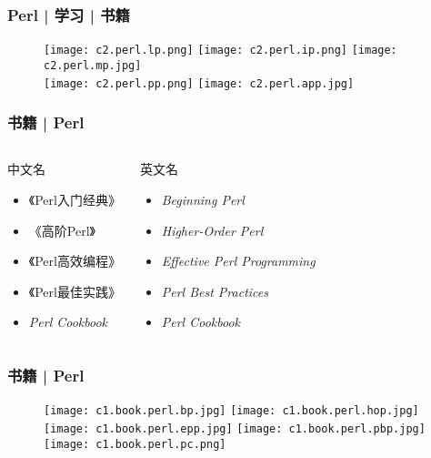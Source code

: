 \begin{frame}
  \frametitle{Perl | 学习 | 书籍}
  \begin{figure}
    \centering
    \texttt{[image: c2.perl.lp.png]}
    \qquad
    \texttt{[image: c2.perl.ip.png]}
    \qquad
    \texttt{[image: c2.perl.mp.jpg]}\\
    \texttt{[image: c2.perl.pp.png]}
    \hspace{2cm}
    \texttt{[image: c2.perl.app.jpg]}
  \end{figure}
\end{frame}

\begin{frame}
  \frametitle{书籍 | Perl}
  \begin{columns}
  \begin{block}{中文名}
    \begin{itemize}
      \item 《Perl入门经典》
      \item 《高阶Perl》
      \item 《Perl高效编程》
      \item 《Perl最佳实践》
      \item \textit{Perl Cookbook}
    \end{itemize}
  \end{block}
  \begin{block}{英文名}
    \begin{itemize}
      \item \textit{Beginning Perl}
      \item \textit{Higher-Order Perl}
      \item \textit{Effective Perl Programming}
      \item \textit{Perl Best Practices}
      \item \textit{Perl Cookbook}
    \end{itemize}
  \end{block}
\end{columns}
\end{frame}

\begin{frame}
  \frametitle{书籍 | Perl}
  \begin{figure}
    \centering
    \texttt{[image: c1.book.perl.bp.jpg]}\qquad
    \texttt{[image: c1.book.perl.hop.jpg]}\\
    \texttt{[image: c1.book.perl.epp.jpg]}\quad
    \texttt{[image: c1.book.perl.pbp.jpg]}\quad
    \texttt{[image: c1.book.perl.pc.png]}
  \end{figure}
\end{frame}

